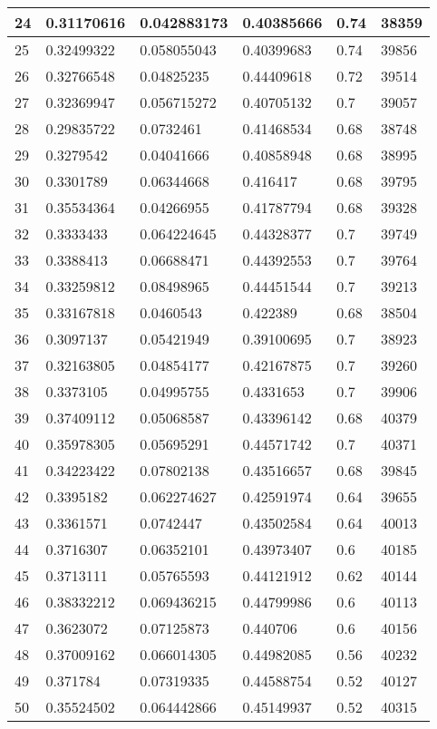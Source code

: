 \begin{longtable}{|l|l|l|l|l|l|}
24 & 0.31170616 & 0.042883173 & 0.40385666 & 0.74 & 38359 \\ \hline 
25 & 0.32499322 & 0.058055043 & 0.40399683 & 0.74 & 39856 \\ \hline 
26 & 0.32766548 & 0.04825235 & 0.44409618 & 0.72 & 39514 \\ \hline 
27 & 0.32369947 & 0.056715272 & 0.40705132 & 0.7 & 39057 \\ \hline 
28 & 0.29835722 & 0.0732461 & 0.41468534 & 0.68 & 38748 \\ \hline 
29 & 0.3279542 & 0.04041666 & 0.40858948 & 0.68 & 38995 \\ \hline 
30 & 0.3301789 & 0.06344668 & 0.416417 & 0.68 & 39795 \\ \hline 
31 & 0.35534364 & 0.04266955 & 0.41787794 & 0.68 & 39328 \\ \hline 
32 & 0.3333433 & 0.064224645 & 0.44328377 & 0.7 & 39749 \\ \hline 
33 & 0.3388413 & 0.06688471 & 0.44392553 & 0.7 & 39764 \\ \hline 
34 & 0.33259812 & 0.08498965 & 0.44451544 & 0.7 & 39213 \\ \hline 
35 & 0.33167818 & 0.0460543 & 0.422389 & 0.68 & 38504 \\ \hline 
36 & 0.3097137 & 0.05421949 & 0.39100695 & 0.7 & 38923 \\ \hline 
37 & 0.32163805 & 0.04854177 & 0.42167875 & 0.7 & 39260 \\ \hline 
38 & 0.3373105 & 0.04995755 & 0.4331653 & 0.7 & 39906 \\ \hline 
39 & 0.37409112 & 0.05068587 & 0.43396142 & 0.68 & 40379 \\ \hline 
40 & 0.35978305 & 0.05695291 & 0.44571742 & 0.7 & 40371 \\ \hline 
41 & 0.34223422 & 0.07802138 & 0.43516657 & 0.68 & 39845 \\ \hline 
42 & 0.3395182 & 0.062274627 & 0.42591974 & 0.64 & 39655 \\ \hline 
43 & 0.3361571 & 0.0742447 & 0.43502584 & 0.64 & 40013 \\ \hline 
44 & 0.3716307 & 0.06352101 & 0.43973407 & 0.6 & 40185 \\ \hline 
45 & 0.3713111 & 0.05765593 & 0.44121912 & 0.62 & 40144 \\ \hline 
46 & 0.38332212 & 0.069436215 & 0.44799986 & 0.6 & 40113 \\ \hline 
47 & 0.3623072 & 0.07125873 & 0.440706 & 0.6 & 40156 \\ \hline 
48 & 0.37009162 & 0.066014305 & 0.44982085 & 0.56 & 40232 \\ \hline 
49 & 0.371784 & 0.07319335 & 0.44588754 & 0.52 & 40127 \\ \hline 
50 & 0.35524502 & 0.064442866 & 0.45149937 & 0.52 & 40315 \\ \hline 
\end{longtable}